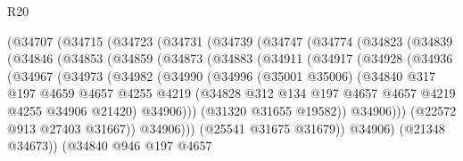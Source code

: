 \begin{lexlean}{R20}
\begin{coremodule}
        (@34707
          (@34715
            (@34723
              (@34731
                (@34739
                  (@34747
                    (@34774
                      (@34823
                        (@34839
                          (@34846
                            (@34853
                              (@34859
                                (@34873
                                  (@34883
                                    (@34911
                                      (@34917
                                        (@34928
                                          (@34936
                                            (@34967
                                              (@34973
                                                (@34982
                                                  (@34990
                                                    (@34996
                                                      (@35001 @35006)
                                                      (@34840
                                                        @317
                                                        @197
                                                        @4659
                                                        @4657
                                                        @4255
                                                        @4219
                                                        (@34828
                                                          @312
                                                          @134
                                                          @197
                                                          @4657
                                                          @4657
                                                          @4219
                                                          @4255
                                                          @34906
                                                          @21420)
                                                        @34906)))
                                                  (@31320 @31655 @19582))
                                                @34906)))
                                          (@22572 @913 @27403 @31667))
                                        @34906)))
                                  (@25541 @31675 @31679))
                                @34906)
                              (@21348 @34673))
                            (@34840
                              @946
                              @197
                              @4657

\end{coremodule}
\end{lexlean}
